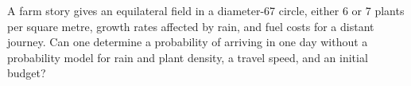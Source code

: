A farm story gives an equilateral field in a diameter-67 circle, either 6 or 7 plants per square metre, growth rates affected by rain, and fuel costs for a distant journey. Can one determine a probability of arriving in one day without a probability model for rain and plant density, a travel speed, and an initial budget?
